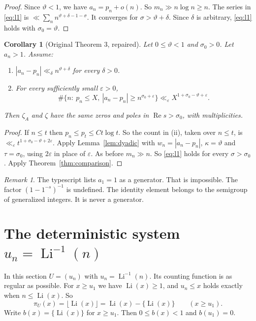 \documentclass[12pt,letterpaper]{article}
\newtheorem{corollary}[theorem]{Corollary}
\theoremstyle{definition}
\theoremstyle{remark}
\newtheorem{remark}[theorem]{Remark}
\newcommand{\Li}{\operatorname{Li}}
\newcommand{\Ree}{\operatorname{Re}}
\newcommand{\eps}{\varepsilon}
\begin{document}
\begin{proof}
Since $\vartheta<1$, we have $a_n=p_n+o(n)$. So $m_n\gg n\log n\ge n$. The
series in \eqref{eq:l1} is $\ll\sum_n n^{\vartheta+\delta-1-\sigma}$. It
converges for $\sigma>\vartheta+\delta$. Since $\delta$ is arbitrary,
\eqref{eq:l1} holds with $\sigma_0=\vartheta$.
\end{proof}

\begin{corollary}[Original Theorem 3, repaired]\label{cor:sparseA}
Let $0\le\vartheta<1$ and $\sigma_0>0$. Let $a_n>1$. Assume:
\begin{enumerate}[label=(\roman*)]
\item $|a_n-p_n|\ll_\delta n^{\vartheta+\delta}$ for every $\delta>0$.
\item For every sufficiently small $\eps>0$,
\[
\#\{n:\ p_n\le X,\ |a_n-p_n|\ge n^{\sigma_0+\eps}\}
\ll_\eps X^{1+\sigma_0-\vartheta+\eps}.
\]
\end{enumerate}
Then $\zeta_A$ and $\zeta$ have the same zeros and poles in
$\Ree s>\sigma_0$, with multiplicities.
\end{corollary}

\begin{proof}
If $n\le t$ then $p_n\le p_t\le Ct\log t$. So the count in (ii), taken over
$n\le t$, is $\ll_\eps t^{1+\sigma_0-\vartheta+2\eps}$. Apply
Lemma~\ref{lem:dyadic} with $w_n=|a_n-p_n|$, $\kappa=\vartheta$ and
$\tau=\sigma_0$, using $2\eps$ in place of $\eps$. As before
$m_n\gg n$. So \eqref{eq:l1} holds for every $\sigma>\sigma_0$. Apply
Theorem~\ref{thm:comparison}.
\end{proof}

\begin{remark}
The typescript lists $a_1=1$ as a generator. That is impossible. The
factor $(1-1^{-s})^{-1}$ is undefined. The identity element belongs to
the semigroup of generalized integers. It is never a generator.
\end{remark}

\section{The deterministic system \texorpdfstring{$u_n=\Li^{-1}(n)$}{u\_n = Li\^{}(-1)(n)}}
\label{sec:deterministic}

In this section $U=(u_n)$ with $u_n=\Li^{-1}(n)$. Its counting function is
as regular as possible. For $x\ge u_1$ we have $\Li(x)\ge1$, and $u_n\le x$
holds exactly when $n\le\Li(x)$. So
\begin{equation}\label{eq:piU}
\pi_U(x)=\lfloor\Li(x)\rfloor=\Li(x)-\{\Li(x)\}\qquad(x\ge u_1).
\end{equation}
Write $b(x)=\{\Li(x)\}$ for $x\ge u_1$. Then $0\le b(x)<1$ and $b(u_1)=0$.
\end{document}
